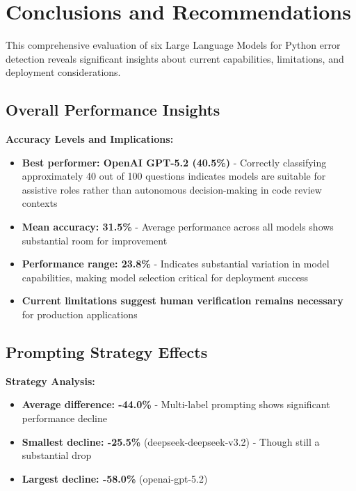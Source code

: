 \documentclass[12pt,a4paper]{article}
\begin{document}
\newpage

\section{Conclusions and Recommendations}

This comprehensive evaluation of six Large Language Models for Python error detection reveals significant insights about current capabilities, limitations, and deployment considerations.

\subsection{Overall Performance Insights}

\textbf{Accuracy Levels and Implications:}
\begin{itemize}[leftmargin=*]
    \item \textbf{Best performer: OpenAI GPT-5.2 (40.5\%)} - Correctly classifying approximately 40 out of 100 questions indicates models are suitable for assistive roles rather than autonomous decision-making in code review contexts
    
    \item \textbf{Mean accuracy: 31.5\%} - Average performance across all models shows substantial room for improvement
    
    \item \textbf{Performance range: 23.8\%} - Indicates substantial variation in model capabilities, making model selection critical for deployment success
    
    \item \textbf{Current limitations suggest human verification remains necessary} for production applications
\end{itemize}

\subsection{Prompting Strategy Effects}

\textbf{Strategy Analysis:}
\begin{itemize}[leftmargin=*]
    \item \textbf{Average difference: -44.0\%} - Multi-label prompting shows significant performance decline
    
    \item \textbf{Smallest decline: -25.5\%} (deepseek-deepseek-v3.2) - Though still a substantial drop
    
    \item \textbf{Largest decline: -58.0\%} (openai-gpt-5.2)
\end{itemize}
\end{document}
